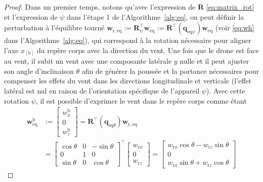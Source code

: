     \begin{proof}
        Dans un premier temps, notons qu'avec l'expression de $\boldsymbol{R}$ \eqref{eq:matrix_rot} et l'expression de  $\psi$ dans l'étape 1 de l'Algorithme~\ref{alg:eq}, on peut définir la perturbation à l'équilibre tourné $\boldsymbol{w}_{\mathrm{r,eq}} := \boldsymbol{R}^\top_{\psi} \boldsymbol{w}_{\mathrm{eq}} :=    \boldsymbol{R}^\top(\boldsymbol{q}_{\mathrm{eq}\psi})\boldsymbol{w}_{\mathrm{eq}}$ (voir \eqref{eq:wh} dans l'Algorithme~\ref{alg:eq}),
        qui correspond à la rotation nécessaire pour aligner l'axe  $x_{[\text{b}]}$ du repère corps avec la direction du vent. Une fois que le drone est face au vent, il subit un vent avec une composante latérale $y$ nulle et il peut ajuster son angle d'inclinaison $\theta$ afin de générer la poussée et la portance nécessaires pour compenser les effets du vent dans les directions longitudinale et verticale (l'effet latéral est nul en raison de l'orientation spécifique de l'appareil $\psi$). Avec cette rotation $\psi$, il est possible d'exprimer le vent dans le repère corps comme étant
            \begin{align}
            \label{eq:wb}
                \boldsymbol{w}^{\text{b}}_{\mathrm{eq}} &:= 
                \begin{bmatrix}
                    w_{x}^{\text{b}} \\ 0 \\ w_{z}^{\text{b}}
                \end{bmatrix} \!=\! 
                \boldsymbol{R}^\top(\boldsymbol{q}_{\text{eq}\theta}) \boldsymbol{w}_{\mathrm{r,eq}}  \\
                &=\!\! \begin{bmatrix}
                    \cos{\theta} & 0 & -\sin{\theta}\\
                        0 & 1 & 0\\
                    \sin{\theta} & 0 & \cos{\theta}
                \end{bmatrix}^\top \!\! \begin{bmatrix}
                    w_{\text{r}x}\\
                    0\\
                    w_{\text{r}z}
                \end{bmatrix}
                \!\!=\!\!\begin{bmatrix}
                    w_{\text{r}x} \cos{\theta} - w_{\text{r}z} \sin{\theta}\\
                    0\\
                    w_{\text{r}x} \sin{\theta} +  w_{\text{r}z} \cos{\theta}
                \end{bmatrix}
            \nonumber
            \end{align}


\end{proof}
